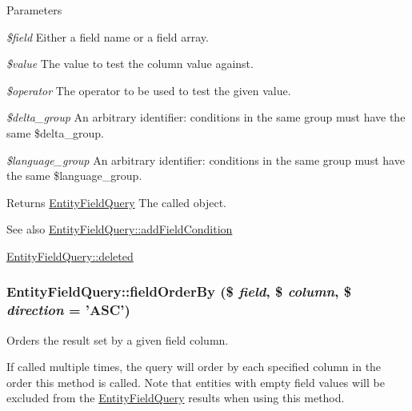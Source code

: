 \begin{DoxyParams}{Parameters}
\item[{\em \$field}]Either a field name or a field array. \item[{\em \$value}]The value to test the column value against. \item[{\em \$operator}]The operator to be used to test the given value. \item[{\em \$delta\_\-group}]An arbitrary identifier: conditions in the same group must have the same \$delta\_\-group. \item[{\em \$language\_\-group}]An arbitrary identifier: conditions in the same group must have the same \$language\_\-group.\end{DoxyParams}
\begin{DoxyReturn}{Returns}
\hyperlink{classEntityFieldQuery}{EntityFieldQuery} The called object.
\end{DoxyReturn}
\begin{DoxySeeAlso}{See also}
\hyperlink{classEntityFieldQuery_addc28605e17a54c0198f3cd6e2753489}{EntityFieldQuery::addFieldCondition} 

\hyperlink{classEntityFieldQuery_a49543cc7ea0841ba46d4ebe310695ce3}{EntityFieldQuery::deleted} 
\end{DoxySeeAlso}
\hypertarget{classEntityFieldQuery_ad2256f83946cc87c91a960f7a81ce833}{
\subsubsection[{fieldOrderBy}]{\setlength{\rightskip}{0pt plus 5cm}EntityFieldQuery::fieldOrderBy (\$ {\em field}, \/  \$ {\em column}, \/  \$ {\em direction} = {\ttfamily 'ASC'})}}
\label{classEntityFieldQuery_ad2256f83946cc87c91a960f7a81ce833}
Orders the result set by a given field column.

If called multiple times, the query will order by each specified column in the order this method is called. Note that entities with empty field values will be excluded from the \hyperlink{classEntityFieldQuery}{EntityFieldQuery} results when using this method.


